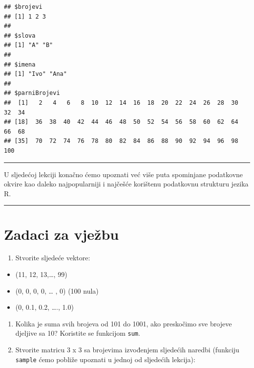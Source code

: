 \documentclass[]{book}
\providecommand{\tightlist}{%
  \setlength{\itemsep}{0pt}\setlength{\parskip}{0pt}}
\theoremstyle{definition}
\theoremstyle{definition}
\theoremstyle{definition}
\theoremstyle{remark}
\begin{document}
\begin{verbatim}
## $brojevi
## [1] 1 2 3
## 
## $slova
## [1] "A" "B"
## 
## $imena
## [1] "Ivo" "Ana"
## 
## $parniBrojevi
##  [1]   2   4   6   8  10  12  14  16  18  20  22  24  26  28  30  32  34
## [18]  36  38  40  42  44  46  48  50  52  54  56  58  60  62  64  66  68
## [35]  70  72  74  76  78  80  82  84  86  88  90  92  94  96  98 100
\end{verbatim}

\begin{center}\rule{0.5\linewidth}{\linethickness}\end{center}

U sljedećoj lekciji konačno ćemo upoznati već više puta spominjane
podatkovne okvire kao daleko najpopularniji i najčešće korištenu
podatkovnu strukturu jezika R.

\begin{center}\rule{0.5\linewidth}{\linethickness}\end{center}

\section*{Zadaci za vježbu}\label{zadaci-za-vjezbu-1}

\begin{enumerate}
\def\labelenumi{\arabic{enumi}.}
\tightlist
\item
  Stvorite sljedeće vektore:
\end{enumerate}

\begin{itemize}
\tightlist
\item
  (11, 12, 13,\ldots{}, 99)
\item
  (0, 0, 0, 0, \ldots{} , 0) (100 nula)
\item
  (0, 0.1, 0.2, \ldots{}., 1.0)
\end{itemize}

\begin{enumerate}
\def\labelenumi{\arabic{enumi}.}
\setcounter{enumi}{1}
\item
  Kolika je suma svih brojeva od 101 do 1001, ako preskočimo sve brojeve
  djeljive sa 10? Koristite se funkcijom \texttt{sum}.
\item
  Stvorite matricu 3 x 3 sa brojevima izvođenjem sljedećih naredbi
  (funkciju \texttt{sample} ćemo pobliže upoznati u jednoj od sljedećih
  lekcija):
\end{enumerate}
\end{document}
